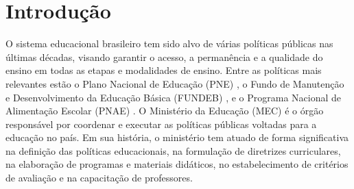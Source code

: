 \chapter{Introdução}

O sistema educacional brasileiro tem sido alvo de várias políticas públicas nas últimas décadas, visando garantir o acesso, a permanência e a qualidade do ensino em todas as etapas e modalidades de ensino. Entre as políticas mais relevantes estão o Plano Nacional de Educação (PNE) \cite{PNE:2001}, o Fundo de Manutenção e Desenvolvimento da Educação Básica (FUNDEB) \cite{FUNDEB:2020}, e o Programa Nacional de Alimentação Escolar (PNAE) \cite{PNAE:2009}. O Ministério da Educação (MEC) é o órgão responsável por coordenar e executar as políticas públicas voltadas para a educação no país. Em sua história, o ministério tem atuado de forma significativa na definição das políticas educacionais, na formulação de diretrizes curriculares, na elaboração de programas e materiais didáticos, no estabelecimento de critérios de avaliação e na capacitação de professores.

